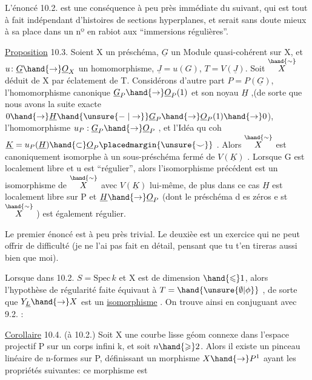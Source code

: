 
L'énoncé 10.2. est une conséquence à peu près immédiate du suivant,
\placedmargin{|}qui est tout à fait indépendant d'histoires de sections hyperplanes, et
serait sans doute mieux à sa place dans  un nº en rabiot aux
``immersions régulières''.

\placedmargin{|}\placedmargin{\unsure{$\backslash\,/$}}\uline{Proposition} 10.3. Soient X un préschéma,  $\underline{G}$ un Module quasi-cohérent
sur X, et $u\colon \underline{G}\hand{\to}\underline{O}_X$ un homomorphisme, $\underline{J} = u(G)$, $T=V(\underline{J})$. Soit
$\overset{\hand{\sim}}{X}$ déduit de X par éclatement de T. Considérons d'autre part
$P = P(\underline{G})$, l'homomorphisme canonique $\underline{G}_P\hand{\to}\underline{O}_P(1)$ et son noyau
$\underline{H}$ ,(de sorte que nous avons la suite exacte $0\hand{\to}\underline{H}\hand{\unsure{\relbar|\to}}\underline{G}_P\hand{\to}\underline{O}_P(1)\hand{\to}0$),
l'homomorphisme $u_P : \underline{G}_P \hand{\to} \underline{O}_P$ , et l'Idéa qu coh $\underline{K} = u_P(\underline{H})\hand{\subset}\underline{O}_P\placedmargin{\unsure{\smile}}$ .
Alors $\overset{\hand{\sim}}{X}$ est canoniquement isomorphe à un sous-préschéma fermé de
$V(\underline{K})$ . Lorsque G est localement libre et u est ``régulier'', alors
l'isomorphisme précédent est un isomorphisme de $\overset{\hand{\sim}}{X}$ avec $V(\underline{K})$ lui-même,
de plus dans ce cas $\underline{H}$ est localement libre sur P et  $\underline{H}\hand{\to}\underline{O}_P$
(dont le préschéma d es zéros e st $\overset{\hand{\sim}}{X}$ ) est également régulier.

Le premier énoncé est à peu près trivial. Le deuxièe est un
exercice qui ne peut offrir de difficulté (je ne l'ai pas fait en
détail, pensant que tu t'en tireras aussi bien que moi).

Lorsque dans 10.2.  $S = \mathrm{Spec}\,k$ et X est de dimension $\hand{\leqslant}1$,
alors l'hypothèse de régularité faite équivaut à $T = \hand{\unsure{\emptyset|\phi}}$ , de sorte
que $Y_{\underline{L}}\hand{\to} X$ est un \uline{isomorphisme} . On trouve ainsi\hand{;} en conjuguant
avec 9.2. :

\uline{Corollaire} 10.4. (à 10.2.) Soit X une courbe lisse géom connexe dans
 l'espace projectif P sur un corps infini k, et soit $n\hand{\geqslant}2$.
Alors il existe un pinceau linéaire de n-formes sur P, définissant un
morphisme $X\hand{\to}P^1$ ayant les propriétés suivantes: ce morphisme est

